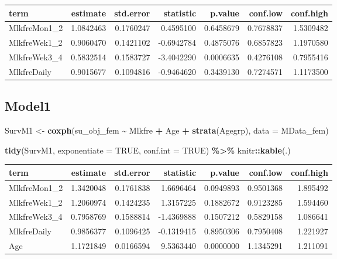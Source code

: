 \documentclass[
]{article}
\newenvironment{Shaded}{\begin{snugshade}}{\end{snugshade}}
\newcommand{\DataTypeTok}[1]{\textcolor[rgb]{0.13,0.29,0.53}{#1}}
\newcommand{\KeywordTok}[1]{\textcolor[rgb]{0.13,0.29,0.53}{\textbf{#1}}}
\newcommand{\NormalTok}[1]{#1}
\newcommand{\OperatorTok}[1]{\textcolor[rgb]{0.81,0.36,0.00}{\textbf{#1}}}
\newcommand{\OtherTok}[1]{\textcolor[rgb]{0.56,0.35,0.01}{#1}}
\newcommand{\StringTok}[1]{\textcolor[rgb]{0.31,0.60,0.02}{#1}}
\begin{document}
\begin{longtable}[]{@{}lrrrrrr@{}}
\toprule
term & estimate & std.error & statistic & p.value & conf.low &
conf.high\tabularnewline
\midrule
\endhead
MlkfreMon1\_2 & 1.0842463 & 0.1760247 & 0.4595100 & 0.6458679 &
0.7678837 & 1.5309482\tabularnewline
MlkfreWek1\_2 & 0.9060470 & 0.1421102 & -0.6942784 & 0.4875076 &
0.6857823 & 1.1970580\tabularnewline
MlkfreWek3\_4 & 0.5832514 & 0.1583727 & -3.4042290 & 0.0006635 &
0.4276108 & 0.7955416\tabularnewline
MlkfreDaily & 0.9015677 & 0.1094816 & -0.9464620 & 0.3439130 & 0.7274571
& 1.1173500\tabularnewline
\bottomrule
\end{longtable}

\hypertarget{model1-8}{%
\subsection{Model1}\label{model1-8}}

\begin{Shaded}
\begin{Highlighting}[]
\NormalTok{SurvM1 \textless{}{-}}\StringTok{  }\KeywordTok{coxph}\NormalTok{(su\_obj\_fem }\OperatorTok{\textasciitilde{}}\StringTok{ }\NormalTok{Mlkfre }\OperatorTok{+}\StringTok{ }\NormalTok{Age }\OperatorTok{+}\StringTok{ }\KeywordTok{strata}\NormalTok{(Agegrp), }
                 \DataTypeTok{data =}\NormalTok{ MData\_fem)}

\KeywordTok{tidy}\NormalTok{(SurvM1, }\DataTypeTok{exponentiate =} \OtherTok{TRUE}\NormalTok{, }\DataTypeTok{conf.int =} \OtherTok{TRUE}\NormalTok{) }\OperatorTok{\%\textgreater{}\%}\StringTok{ }
\StringTok{  }\NormalTok{knitr}\OperatorTok{::}\KeywordTok{kable}\NormalTok{(.)}
\end{Highlighting}
\end{Shaded}

\begin{longtable}[]{@{}lrrrrrr@{}}
\toprule
term & estimate & std.error & statistic & p.value & conf.low &
conf.high\tabularnewline
\midrule
\endhead
MlkfreMon1\_2 & 1.3420048 & 0.1761838 & 1.6696464 & 0.0949893 &
0.9501368 & 1.895492\tabularnewline
MlkfreWek1\_2 & 1.2060974 & 0.1424235 & 1.3157225 & 0.1882672 &
0.9123285 & 1.594460\tabularnewline
MlkfreWek3\_4 & 0.7958769 & 0.1588814 & -1.4369888 & 0.1507212 &
0.5829158 & 1.086641\tabularnewline
MlkfreDaily & 0.9856377 & 0.1096425 & -0.1319415 & 0.8950306 & 0.7950408
& 1.221927\tabularnewline
Age & 1.1721849 & 0.0166594 & 9.5363440 & 0.0000000 & 1.1345291 &
1.211091\tabularnewline
\bottomrule
\end{longtable}
\end{document}
